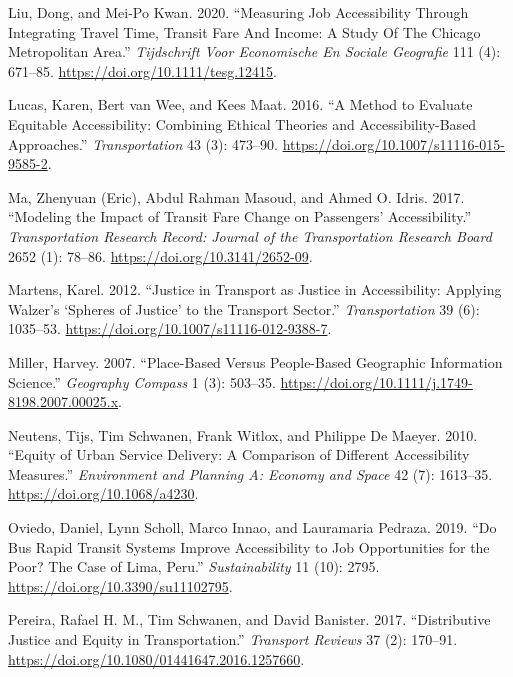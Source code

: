 \documentclass[msc,numbers]{coppe}
\begin{document}
\begin{CSLReferences}{1}{0}
  \leavevmode\hypertarget{ref-liu2020measuring}{}%
  Liu, Dong, and Mei-Po Kwan. 2020. {``Measuring {Job Accessibility Through Integrating Travel Time}, {Transit Fare And Income}: {A Study Of The Chicago Metropolitan Area}.''} \emph{Tijdschrift Voor Economische En Sociale Geografie} 111 (4): 671--85. \url{https://doi.org/10.1111/tesg.12415}.

  \leavevmode\hypertarget{ref-lucas2016method}{}%
  Lucas, Karen, Bert van Wee, and Kees Maat. 2016. {``A Method to Evaluate Equitable Accessibility: Combining Ethical Theories and Accessibility-Based Approaches.''} \emph{Transportation} 43 (3): 473--90. \url{https://doi.org/10.1007/s11116-015-9585-2}.

  \leavevmode\hypertarget{ref-ma2017modeling}{}%
  Ma, Zhenyuan (Eric), Abdul Rahman Masoud, and Ahmed O. Idris. 2017. {``Modeling the {Impact} of {Transit Fare Change} on {Passengers}' {Accessibility}.''} \emph{Transportation Research Record: Journal of the Transportation Research Board} 2652 (1): 78--86. \url{https://doi.org/10.3141/2652-09}.

  \leavevmode\hypertarget{ref-martens2012justice}{}%
  Martens, Karel. 2012. {``Justice in Transport as Justice in Accessibility: Applying {Walzer}'s {`{Spheres} of {Justice}'} to the Transport Sector.''} \emph{Transportation} 39 (6): 1035--53. \url{https://doi.org/10.1007/s11116-012-9388-7}.

  \leavevmode\hypertarget{ref-miller2007placebased}{}%
  Miller, Harvey. 2007. {``Place-{Based} Versus {People}-{Based Geographic Information Science}.''} \emph{Geography Compass} 1 (3): 503--35. \url{https://doi.org/10.1111/j.1749-8198.2007.00025.x}.

  \leavevmode\hypertarget{ref-neutens2010equity}{}%
  Neutens, Tijs, Tim Schwanen, Frank Witlox, and Philippe De Maeyer. 2010. {``Equity of {Urban Service Delivery}: {A Comparison} of {Different Accessibility Measures}.''} \emph{Environment and Planning A: Economy and Space} 42 (7): 1613--35. \url{https://doi.org/10.1068/a4230}.

  \leavevmode\hypertarget{ref-oviedo2019bus}{}%
  Oviedo, Daniel, Lynn Scholl, Marco Innao, and Lauramaria Pedraza. 2019. {``Do {Bus Rapid Transit Systems Improve Accessibility} to {Job Opportunities} for the {Poor}? {The Case} of {Lima}, {Peru}.''} \emph{Sustainability} 11 (10): 2795. \url{https://doi.org/10.3390/su11102795}.

  \leavevmode\hypertarget{ref-pereira2017distributive}{}%
  Pereira, Rafael H. M., Tim Schwanen, and David Banister. 2017. {``Distributive Justice and Equity in Transportation.''} \emph{Transport Reviews} 37 (2): 170--91. \url{https://doi.org/10.1080/01441647.2016.1257660}.


\end{CSLReferences}
\end{document}
